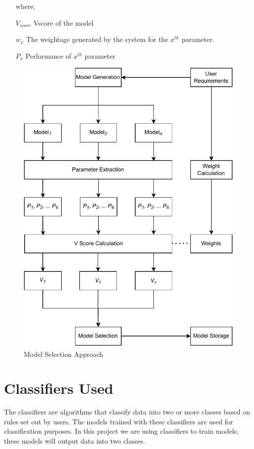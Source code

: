 \begin{itemize}
    \item[where,]
    \item[$V_{score}$] Vscore of the model
    \item[$w_x$] The weightage generated by the system for the $x^{th}$ parameter.
    \item[$P_x$] Performance of $x^{th}$ parameter
\end{itemize}

\begin{figure}
  \centering
  \includegraphics[width=0.9\columnwidth]{media/architecture/math_model_relaxed.pdf}
  \caption{Model Selection Approach}
  \label{fig:model_selection_approach}
\end{figure}

\section{Classifiers Used} \label{sec:supervised_learning}

The classifiers are algorithms that classify data into two or more classes based on rules set out by users. The models trained with these classifiers are used for classification purposes. In this project we are using classifiers to train models, these models will output data into two classes.

